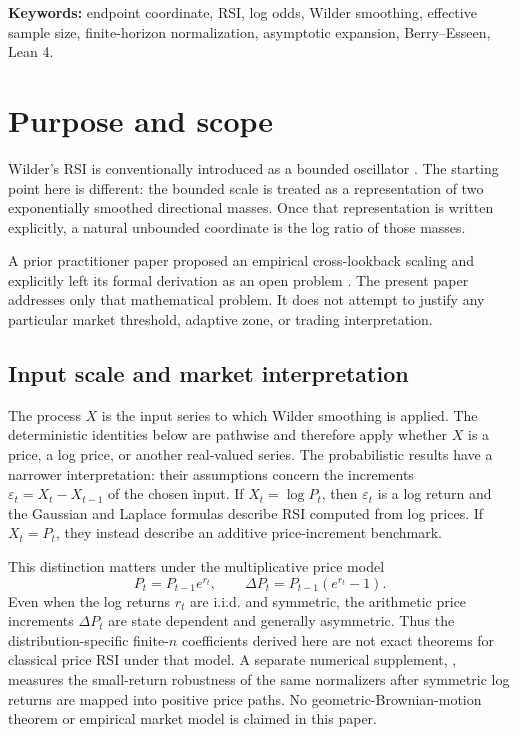 \documentclass[11pt]{article}
\begin{document}
\noindent\textbf{Keywords:} endpoint coordinate, RSI, log odds, Wilder
smoothing, effective sample size, finite-horizon normalization, asymptotic
expansion, Berry--Esseen, Lean 4.

\section{Purpose and scope}
Wilder's RSI is conventionally introduced as a bounded oscillator
\cite{wilder}. The starting point here is different: the bounded scale is
treated as a representation of two exponentially smoothed directional masses.
Once that representation is written explicitly, a natural unbounded
coordinate is the log ratio of those masses.

A prior practitioner paper proposed an empirical cross-lookback scaling and explicitly left its formal derivation as an open problem \cite{malmyga2025}. The present paper addresses only that mathematical problem. It does not attempt to justify any particular market threshold, adaptive zone, or trading interpretation.

\subsection*{Input scale and market interpretation}
The process $X$ is the input series to which Wilder smoothing is applied.  The
deterministic identities below are pathwise and therefore apply whether $X$ is
a price, a log price, or another real-valued series.  The probabilistic results
have a narrower interpretation: their assumptions concern the increments
$\varepsilon_t=X_t-X_{t-1}$ of the chosen input.  If $X_t=\log P_t$, then
$\varepsilon_t$ is a log return and the Gaussian and Laplace formulas describe
RSI computed from log prices.  If $X_t=P_t$, they instead describe an additive
price-increment benchmark.

This distinction matters under the multiplicative price model
\begin{equation}
P_t=P_{t-1}e^{r_t},
\qquad
\Delta P_t=P_{t-1}(e^{r_t}-1).
\end{equation}
Even when the log returns $r_t$ are i.i.d. and symmetric, the arithmetic price
increments $\Delta P_t$ are state dependent and generally asymmetric.  Thus
the distribution-specific finite-$n$ coefficients derived here are not exact
theorems for classical price RSI under that model.  A separate numerical
supplement, , measures the
small-return robustness of the same normalizers after symmetric log returns
are mapped into positive price paths.  No geometric-Brownian-motion theorem or
empirical market model is claimed in this paper.
\end{document}
